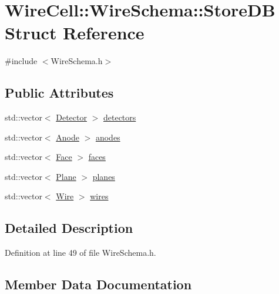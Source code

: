 \hypertarget{struct_wire_cell_1_1_wire_schema_1_1_store_d_b}{}\section{Wire\+Cell\+:\+:Wire\+Schema\+:\+:Store\+DB Struct Reference}
\label{struct_wire_cell_1_1_wire_schema_1_1_store_d_b}


{\ttfamily \#include $<$Wire\+Schema.\+h$>$}

\subsection*{Public Attributes}
\begin{DoxyCompactItemize}
\item 
std\+::vector$<$ \hyperlink{struct_wire_cell_1_1_wire_schema_1_1_detector}{Detector} $>$ \hyperlink{struct_wire_cell_1_1_wire_schema_1_1_store_d_b_ac7f2c2b173fb3561bf8f2a7269766471}{detectors}
\item 
std\+::vector$<$ \hyperlink{struct_wire_cell_1_1_wire_schema_1_1_anode}{Anode} $>$ \hyperlink{struct_wire_cell_1_1_wire_schema_1_1_store_d_b_aa55402f445997dbea8672bbeeb500826}{anodes}
\item 
std\+::vector$<$ \hyperlink{struct_wire_cell_1_1_wire_schema_1_1_face}{Face} $>$ \hyperlink{struct_wire_cell_1_1_wire_schema_1_1_store_d_b_abaf7132b987eb1b53aa7d231452ba2ce}{faces}
\item 
std\+::vector$<$ \hyperlink{struct_wire_cell_1_1_wire_schema_1_1_plane}{Plane} $>$ \hyperlink{struct_wire_cell_1_1_wire_schema_1_1_store_d_b_a40ee482fa913cf795c9e14ca378c7538}{planes}
\item 
std\+::vector$<$ \hyperlink{struct_wire_cell_1_1_wire_schema_1_1_wire}{Wire} $>$ \hyperlink{struct_wire_cell_1_1_wire_schema_1_1_store_d_b_a6cdd13dfbb21a123b54bdd849ed5a4cf}{wires}
\end{DoxyCompactItemize}


\subsection{Detailed Description}


Definition at line 49 of file Wire\+Schema.\+h.



\subsection{Member Data Documentation}
\mbox{\label{struct_wire_cell_1_1_wire_schema_1_1_store_d_b_aa55402f445997dbea8672bbeeb500826}} 
